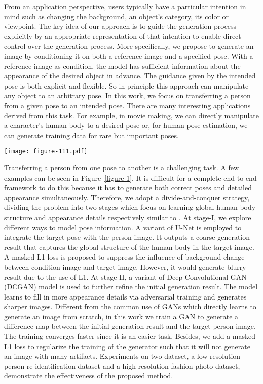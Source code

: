 \documentclass{article}
\begin{document}
From an application perspective, users typically have a particular intention in mind  such as changing the background, an object's category, its color or viewpoint. The key idea of our approach is to guide the generation process explicitly by an appropriate  representation of that intention to enable direct control over the generation process. 
More specifically, we propose to generate an image by conditioning it on both a reference image and a specified pose. With a reference image as condition, the model has sufficient information about the appearance of the desired object in advance. The guidance given by the intended pose is both explicit and flexible. So in principle this approach can manipulate any object to an arbitrary pose. In this work, we focus on transferring a person from a given pose to an intended pose. There are many interesting applications derived from this task. For example, in movie making, we can directly manipulate a character's human body to a desired pose or, for human pose estimation, we can generate training data for rare but important poses. 

\begin{figure*}[t]
  \centering
  \texttt{[image: figure-111.pdf]}\\
  \caption{Generated samples on DeepFashion dataset~\cite{DeepFashion} (a)(c) and Market-1501 dataset~\cite{Market1501} (b). }
\label{figure-1}
\end{figure*}

Transferring a person from one pose to another is a challenging task. A few examples can be seen in Figure~\ref{figure-1}. It is difficult for a complete end-to-end framework to do this because it has to generate both correct poses and detailed appearance simultaneously. Therefore, we adopt a divide-and-conquer strategy, dividing the problem into two stages which focus on learning global human body structure and appearance details respectively similar to \cite{Zhang-stackGAN,huang2016stacked,carreira2016human,newell2016stacked}. At stage-I, we explore different ways to model pose information. A variant of U-Net is  employed to integrate the target pose with the person image. It outputs a coarse generation result that captures the global structure of the human body in the target image. A masked L1 loss is proposed to suppress the influence of background change between condition image and target image. However, it would generate blurry result due to the use of L1. At stage-II, a variant of Deep Convolutional GAN (DCGAN) model is used to further refine the initial generation result. The model learns to fill in more appearance details via adversarial training and generates sharper images. Different from the common use of GANs which directly learns to generate an image from scratch, in this work we train a GAN to generate a difference map between the initial generation result and the target person image. The training converges faster since it is an easier task. Besides, we add a masked L1 loss to regularize the training of the generator such that it will not generate an image with many artifacts. Experiments on two dataset, a low-resolution person re-identification dataset and a high-resolution fashion photo dataset, demonstrate the effectiveness of the proposed method.
\end{document}
